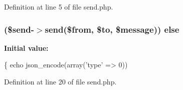 Definition at line 5 of file send.\+php.

\subsubsection[{\texorpdfstring{else}{else}}]{ (\$send-\/$>$send(\$from, \$to, \$message)) else}\hypertarget{_ossn_chat_2actions_2message_2send_8php_a2dcf5bd0c75a4044cdcfb8474e5967dd}{}\label{_ossn_chat_2actions_2message_2send_8php_a2dcf5bd0c75a4044cdcfb8474e5967dd}
{\bfseries Initial value\+:}
\begin{DoxyCode}
\{
    echo json\_encode(array(\textcolor{stringliteral}{'type'} => 0))
\end{DoxyCode}


Definition at line 20 of file send.\+php.

